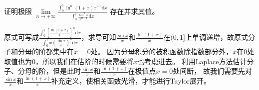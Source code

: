 \documentclass[../../main.tex]{subfiles}
\begin{document}
\begin{example}
证明极限 $\lim\limits_{n \to +\infty} \frac{\int_{0}^{1} \ln^n(1 + x)x^{-n} \mathrm{d}x}{\int_{0}^{1} \frac{\sin^n x}{x^{n - 1}} \mathrm{d}x}$ 存在并求其值。 
\end{example}
\begin{note}
原式可写成$\frac{\int_0^1{\left[ \frac{\ln \left( 1+x \right)}{x} \right] ^n\mathrm{d}x}}{\int_0^1{x\left( \frac{\sin x}{x} \right) ^n\mathrm{d}x}}$，求导可知$\frac{\sin x}{x}$和$\frac{\ln \left( 1+x \right)}{x}$在$(0,1]$上单调递增，故原式分子和分母的阶都集中在$x = 0$处。
因为分母积分的被积函数除指数部分外，$x$在$0$处取值也为$0$，所以我们在估阶的时候需要将$x$也考虑进去。
利用Laplace方法估计分子、分母的阶，但是此时$\frac{\sin x}{x}$和$\frac{\ln \left( 1+x \right)}{x}$在极值点$x = 0$处间断，
故我们需要先对$\frac{\sin x}{x}$和$\frac{\ln \left( 1+x \right)}{x}$补充定义，使相关函数光滑，才能进行Taylor展开。
\end{note}
\end{document}
